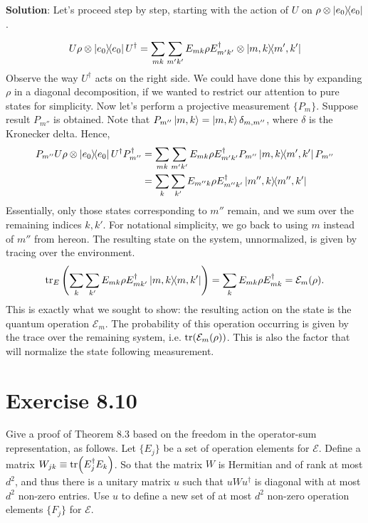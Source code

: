 \documentclass{book}
\begin{document}
    \textbf{Solution}: Let's proceed step by step, starting with the action of $U$ on $\rho \otimes \ketbra{e_0}$.

    \begin{align}
        U \rho \otimes \ketbra{e_0} U^\dagger = \sum_{mk}\sum_{m'k'} E_{mk} \rho E_{m'k'}^\dagger \otimes \ketbra{m,k}{m',k'}
    \end{align}
    Observe the way $U^\dagger$ acts on the right side. We could have done this by expanding $\rho$ in a diagonal decomposition, if we wanted to restrict our attention to pure states for simplicity. Now let's perform a projective measurement $\{P_m \}$. Suppose result $P_{m''}$ is obtained. Note that $P_{m''} \ket{m,k} = \ket{m,k} \delta_{m,m''}$, where $\delta$ is the Kronecker delta. Hence,
    \begin{align}
        P_{m''} U \rho \otimes \ketbra{e_0}U^\dagger P^\dagger_{m''} &= \sum_{mk}\sum_{m'k'} E_{mk} \rho E_{m'k'}^\dagger P_{m''} \ketbra{m,k}{m',k'} P_{m''} \\
        &= \sum_{k}\sum_{k'} E_{m''k} \rho E_{m''k'}^\dagger \ketbra{m'',k}{m'',k'} 
    \end{align}
    Essentially, only those states corresponding to $m''$ remain, and we sum over the remaining indices $k, k'$. For notational simplicity, we go back to using $m$ instead of $m''$ from hereon. The resulting state on the system, unnormalized, is given by tracing over the environment. 
    \begin{align}
        \tr_E \left(\sum_{k}\sum_{k'} E_{mk} \rho E_{mk'}^\dagger \ketbra{m,k}{m,k'}\right) = \sum_{k} E_{mk} \rho E_{mk}^\dagger = \mathcal{E}_m(\rho).
    \end{align}
    This is exactly what we sought to show: the resulting action on the state is the quantum operation $\mathcal{E}_m$. The probability of this operation occurring is given by the trace over the remaining system, i.e. $\tr(\mathcal{E}_m(\rho))$. This is also the factor that will normalize the state following measurement.

\section*{Exercise 8.10}
    Give a proof of Theorem 8.3 based on the freedom in the operator-sum representation, as follows. Let $\{E_j\}$ be a set of operation elements for $\mathcal{E}$. Define a matrix $W_{jk} \equiv \tr(E_j^\dagger E_k)$. So that the matrix $W$ is Hermitian and of rank at most $d^2$, and thus there is a unitary matrix $u$ such that $uWu^\dagger$ is diagonal with at most $d^2$ non-zero entries. Use $u$ to define a new set of at most $d^2$ non-zero operation elements $\{F_j\}$ for $\mathcal{E}$.
\end{document}
